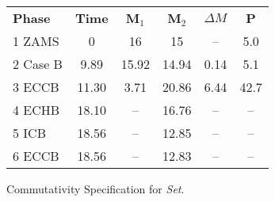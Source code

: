 \begin{figure}
\begin{tabular}{lccccc}
  \textbf{Phase}        & \textbf{Time} & \textbf{M$_1$}  & \textbf{M$_2$} &  \textbf{$\Delta M$} & \textbf{P} \\   
    1 ZAMS           & 0      & 16     & 15    & --   & 5.0   \\            
    2 Case B       & 9.89   & 15.92  & 14.94 & 0.14 & 5.1   \\
    3 ECCB        & 11.30  &  3.71  & 20.86 & 6.44 & 42.7  \\
    4 ECHB      & 18.10  & --     & 16.76 &  --  & --    \\
    5 ICB       & 18.56  & --     & 12.85 &  --  & --    \\    
    6 ECCB      & 18.56  & --     & 12.83 &  --  & --    \\
\end{tabular}
\label{tab:spec}
\caption{Commutativity Specification for \emph{Set}.}
\end{figure}
